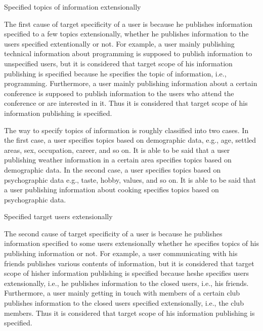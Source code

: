 \begin{description}
\bf {\item[(1)] Specified topics of information extensionally}
\label{item:Topic}
\end{description}

The first cause of target specificity of a user is because
he publishes information specified to a few topics extensionally,
whether he publishes information to the users specified extentionally or
not.  For example, a user mainly publishing technical
information about programming is supposed to publish information to
unspecified users, but it is considered that target scope of
his information publishing is specified because he specifies the
topic of information, i.e., programming.  Furthermore, a user mainly
publishing information about a certain conference is supposed to publish
information to the users who attend the conference or are interested in
it.  Thus it is considered that target scope of his
information publishing is specified.

The way to specify topics of information is roughly classified into two
cases.  In the first case, a user specifies topics based on demographic
data, e.g., age, settled areas, sex, occupation, career, and so on.  It
is able to be said that a user publishing weather information in a
certain area specifies topics based on demographic data.  In the second
case, a user specifies topics based on psychographic data e.g., taste,
hobby, values, and so on.  It is able to be said that a user
publishing information about cooking specifies topics based on
psychographic data.

\begin{description}
\bf{\item[(2)] Specified target users extensionally}
\label{item:User}
\end{description}

The second cause of target specificity of a user is because
he publishes information specified to some users extensionally
whether he specifies topics of his publishing
information or not.  For example, a user communicating with his friends
publishes various contents of information, but it is considered that
target scope of hisher information publishing is specified because
heshe specifies users extensionally, i.e., he publishes
information to the closed users, i.e., his friends.  Furthermore, a user
mainly getting in touch with members of a certain club publishes
information to the closed users specified extensionally, i.e., the club
members.  Thus it is considered that target scope of
his information publishing is specified.

